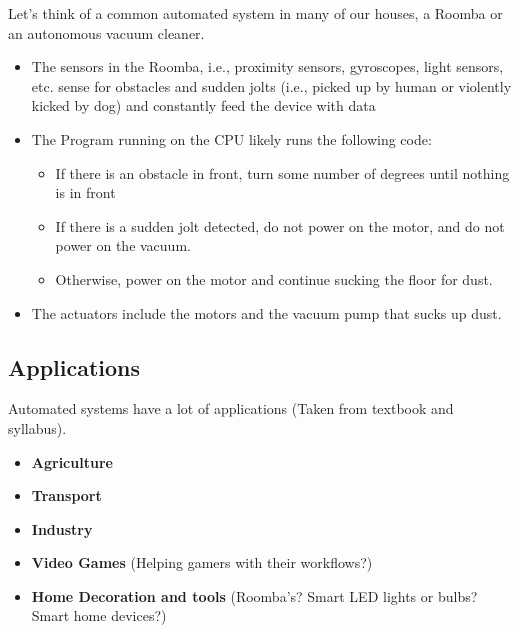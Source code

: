 \documentclass[../main.tex]{subfiles}
\begin{document}
Let’s think of a common automated system in many of our houses, a Roomba or an autonomous vacuum cleaner. 

\begin{itemize}
    \item The sensors in the Roomba, i.e., proximity sensors, gyroscopes, light sensors, etc. sense for obstacles and sudden jolts (i.e., picked up by human or violently kicked by dog) and constantly feed the device with data
    \item The Program running on the CPU likely runs the following code:
        \begin{itemize}
            \item If there is an obstacle in front, turn some number of degrees until nothing is in front
            \item If there is a sudden jolt detected, do not power on the motor, and do not power on the vacuum.
            \item Otherwise, power on the motor and continue sucking the floor for dust.
        \end{itemize}
    \item The actuators include the motors and the vacuum pump that sucks up dust.
\end{itemize}

\subsection{Applications}

Automated systems have a lot of applications (Taken from textbook and syllabus).

\begin{itemize}
    \item \textbf{Agriculture}
    \item \textbf{Transport}
    \item \textbf{Industry}
    \item \textbf{Video Games} (Helping gamers with their workflows?)
    \item \textbf{Home Decoration and tools} (Roomba's? Smart LED lights or bulbs? Smart home devices?)
\end{itemize}
\end{document}
